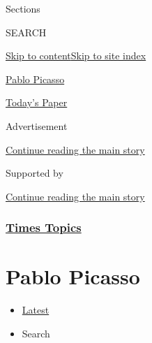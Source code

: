 Sections

SEARCH

\protect\hyperlink{site-content}{Skip to
content}\protect\hyperlink{site-index}{Skip to site index}

\href{https://www.nytimes3xbfgragh.onion/topic/person/pablo-picasso}{Pablo
Picasso}

\href{https://myaccount.nytimes3xbfgragh.onion/auth/login?response_type=cookie\&client_id=vi}{}

\href{https://www.nytimes3xbfgragh.onion/section/todayspaper}{Today's
Paper}

Advertisement

\protect\hyperlink{after-top}{Continue reading the main story}

Supported by

\protect\hyperlink{after-sponsor}{Continue reading the main story}

\hypertarget{times-topics}{%
\subsubsection{\texorpdfstring{\href{/index.html}{Times
Topics}}{Times Topics}}\label{times-topics}}

\hypertarget{pablo-picasso}{%
\section{Pablo Picasso}\label{pablo-picasso}}

\begin{itemize}
\tightlist
\item
  \protect\hyperlink{stream-panel}{Latest}
\item
  Search
\end{itemize}

